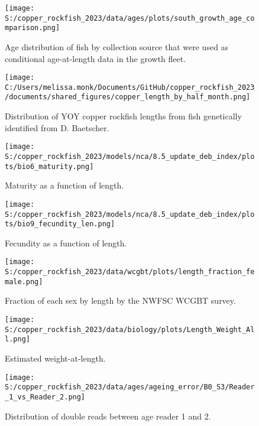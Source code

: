 \documentclass[11pt,
  english,
  letterpaper,
]{article}
\begin{document}
\begin{figure}
\centering
\texttt{[image: S:/copper\_rockfish\_2023/data/ages/plots/south\_growth\_age\_comparison.png]}
\caption{Age distribution of fish by collection source that were used as conditional age-at-length data in the growth fleet.\label{fig:growth-age-dist}}
\end{figure}

\begin{figure}
\centering
\texttt{[image: C:/Users/melissa.monk/Documents/GitHub/copper\_rockfish\_2023/documents/shared\_figures/copper\_length\_by\_half\_month.png]}
\caption{Distribution of YOY copper rockfish lengths from fish genetically identified from D. Baetscher.\label{fig:copper-smurf-length}}
\end{figure}

\begin{figure}
\centering
\texttt{[image: S:/copper\_rockfish\_2023/models/nca/8.5\_update\_deb\_index/plots/bio6\_maturity.png]}
\caption{Maturity as a function of length.\label{fig:maturity}}
\end{figure}

\begin{figure}
\centering
\texttt{[image: S:/copper\_rockfish\_2023/models/nca/8.5\_update\_deb\_index/plots/bio9\_fecundity\_len.png]}
\caption{Fecundity as a function of length.\label{fig:fecundity}}
\end{figure}

\begin{figure}
\centering
\texttt{[image: S:/copper\_rockfish\_2023/data/wcgbt/plots/length\_fraction\_female.png]}
\caption{Fraction of each sex by length by the NWFSC WCGBT survey.\label{fig:frac-sex-len}}
\end{figure}

\begin{figure}
\centering
\texttt{[image: S:/copper\_rockfish\_2023/data/biology/plots/Length\_Weight\_All.png]}
\caption{Estimated weight-at-length.\label{fig:weight-length}}
\end{figure}

\begin{figure}
\centering
\texttt{[image: S:/copper\_rockfish\_2023/data/ages/ageing\_error/B0\_S3/Reader\_1\_vs\_Reader\_2.png]}
\caption{Distribution of double reads between age reader 1 and 2.\label{fig:age-error-dist}}
\end{figure}
\end{document}
